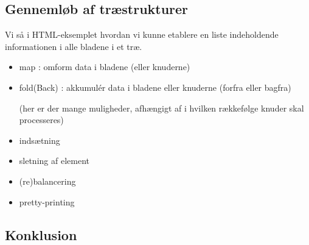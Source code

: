 \documentclass[rgb]{beamer}
\begin{document}
\subsection{Gennemløb af træstrukturer}

\begin{frame}[fragile]
\begin{footnotesize}

  \vspace{1ex}

  Vi så i HTML-eksemplet hvordan vi kunne etablere en liste indeholdende informationen i alle bladene i et træ.

  \vspace{1ex}
  \begin{itemize}
  \item map : omform data i bladene (eller knuderne)
  \item fold(Back) : akkumul\'{e}r data i bladene eller knuderne (forfra eller bagfra)

    (her er der mange muligheder, afhængigt af i hvilken rækkefølge knuder skal processeres)
  \item indsætning
  \item sletning af element
  \item (re)balancering
  \item pretty-printing
  \end{itemize}
\end{footnotesize}
\end{frame}

\subsection*{Konklusion}
\begin{frame}[fragile]

  \vspace{3mm}
  \tableofcontents
\end{frame}
\end{document}
